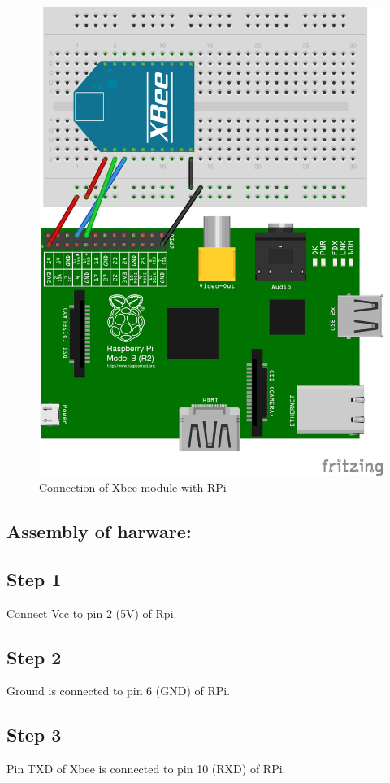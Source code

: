 \documentclass[a4paper,12pt,oneside]{book}
\begin{document}
\begin{figure}[H]
    \centering
    \includegraphics[scale=0.2]{raspi_to_xbee}
    \caption{Connection of Xbee module with RPi}
\end{figure}
\subsection*{Assembly of harware:}
\subsection*{Step 1}
Connect Vcc to pin 2 (5V) of Rpi.
\subsection*{Step 2}
Ground is connected to pin 6 (GND) of RPi.
\subsection*{Step 3}
Pin TXD of Xbee is connected to pin 10 (RXD) of RPi.
\end{document}
